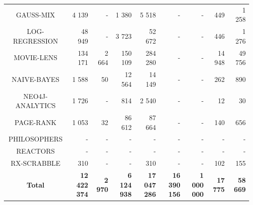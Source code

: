 \documentclass[]{usiinfthesis}
\begin{document}
\begin{table}
\begin{tabular}{|c|r|r|r|r|r|r|r|r|}
	GAUSS-MIX	&	 4 139 	 & 	 -   	 & 	 1 380 	 & 	 5 518 	 & 	 -   	 & 	 -   	 & 	 449 	 & 	 1 258 	 \\ 
	LOG-REGRESSION	&	 48 949 	 & 	 -   	 & 	 3 723 	 & 	 52 672 	 & 	 -   	 & 	 -   	 & 	 446 	 & 	 1 276 	 \\ 
	MOVIE-LENS	&	 134 171 	 & 	 2 664 	 & 	 150 109 	 & 	 284 280 	 & 	 -   	 & 	 -   	 & 	 14 948 	 & 	 49 756 	 \\ 
	NAIVE-BAYES	&	 1 588 	 & 	 50 	 & 	 12 564 	 & 	 14 149 	 & 	 -   	 & 	 -   	 & 	 262 	 & 	 890 	 \\ 
	NEO4J-ANALYTICS	&	 1 726 	 & 	 -   	 & 	 814 	 & 	 2 540 	 & 	 -   	 & 	 -   	 & 	 12 	 & 	 30 	 \\ 
	PAGE-RANK	&	 1 053 	 & 	 32 	 & 	 86 612 	 & 	 87 664 	 & 	 -   	 & 	 -   	 & 	 140 	 & 	 656 	 \\ 
	PHILOSOPHERS	&	 -   	 & 	 -   	 & 	 -   	 & 	 -   	 & 	 -   	 & 	 -   	 & 	 -   	 & 	 -   	 \\ 
	REACTORS	&	 -   	 & 	 -   	 & 	 -   	 & 	 -   	 & 	 -   	 & 	 -   	 & 	 -   	 & 	 -   	 \\ 
	RX-SCRABBLE	&	 310 	 & 	 -   	 & 	 -   	 & 	 310 	 & 	 -   	 & 	 -   	 & 	 102 	 & 	 155 	 \\ \hline
 \textbf{ 	 Total 	 }&\textbf{ 	 12 422 374 	 }&\textbf{ 	 2 970 	 }&\textbf{ 	 6 124 938 	 }&\textbf{ 	 17 047 286 	 }&\textbf{ 	 16 390 156 	 }&\textbf{ 	 1 000 000 	 }&\textbf{ 	 17 775 	 }&\textbf{ 	 58 669 	 }\\

 \hline 	
\end{tabular}
\end{table}%
\end{document}
